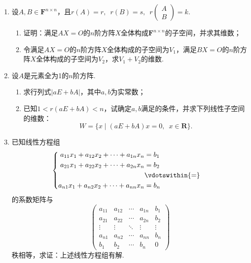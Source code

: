 \begin{enumerate}
    \item 设$A,B\in \mathbf{F}^{n\times n}$，且$r(A)=r,\enspace r(B)=s,\enspace r\begin{pmatrix} A \\ B \end{pmatrix}=k$.
          \begin{enumerate}
              \item 证明：满足$AX=O$的$n$阶方阵$X$全体构成$\mathbf{F}^{n\times n}$的子空间，并求其维数；

              \item 令满足$AX=O$的$n$阶方阵$X$全体构成的子空间为$V_1$，满足$BX=O$的$n$阶方阵$X$全体构成的子空间为$V_2$，求$V_1+V_2$的维数.
          \end{enumerate}

    \item 设$A$是元素全为1的$n$阶方阵.
          \begin{enumerate}
              \item 求行列式$|aE+bA|$，其中$a,b$为实常数；

              \item 已知$1<r(aE+bA)<n$，试确定$a,b$满足的条件，并求下列线性子空间的维数：
                    \[W=\{x \mid (aE+bA)x=0,\enspace x\in\mathbf{R}\}.\]
          \end{enumerate}

    \item 已知线性方程组
          \[\begin{cases} \begin{aligned}
                      a_{11}x_1+a_{12}x_2+\cdots+a_{1n}x_n & =b_1            \\
                      a_{21}x_1+a_{22}x_2+\cdots+a_{2n}x_n & =b_2            \\
                                                           & \vdotswithin{=} \\
                      a_{n1}x_1+a_{n2}x_2+\cdots+a_{nn}x_n & =b_n            \\
                  \end{aligned} \end{cases}\]
          的系数矩阵与
          \[\begin{pmatrix}
                  a_{11} & a_{12} & \cdots & a_{1n} & b_1    \\
                  a_{21} & a_{22} & \cdots & a_{2n} & b_2    \\
                  \vdots & \vdots & \ddots & \vdots & \vdots \\
                  a_{n1} & a_{n2} & \cdots & a_{nn} & b_n    \\
                  b_1    & b_2    & \cdots & b_n    & 0
              \end{pmatrix}\]
          秩相等，求证：上述线性方程组有解.


\end{enumerate}
